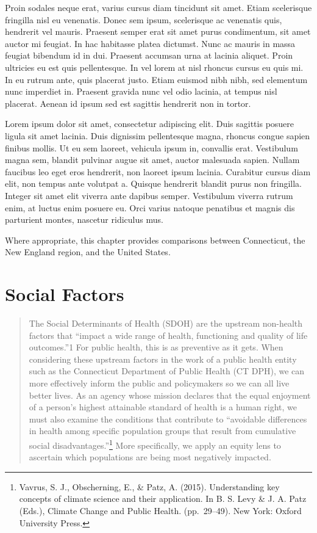 \documentclass[
  letterpaper,
  DIV=11,
  numbers=noendperiod]{scrreprt}
\begin{document}
Proin sodales neque erat, varius cursus diam tincidunt sit amet. Etiam
scelerisque fringilla nisl eu venenatis. Donec sem ipsum, scelerisque ac
venenatis quis, hendrerit vel mauris. Praesent semper erat sit amet
purus condimentum, sit amet auctor mi feugiat. In hac habitasse platea
dictumst. Nunc ac mauris in massa feugiat bibendum id in dui. Praesent
accumsan urna at lacinia aliquet. Proin ultricies eu est quis
pellentesque. In vel lorem at nisl rhoncus cursus eu quis mi. In eu
rutrum ante, quis placerat justo. Etiam euismod nibh nibh, sed elementum
nunc imperdiet in. Praesent gravida nunc vel odio lacinia, at tempus
nisl placerat. Aenean id ipsum sed est sagittis hendrerit non in tortor.

Lorem ipsum dolor sit amet, consectetur adipiscing elit. Duis sagittis
posuere ligula sit amet lacinia. Duis dignissim pellentesque magna,
rhoncus congue sapien finibus mollis. Ut eu sem laoreet, vehicula ipsum
in, convallis erat. Vestibulum magna sem, blandit pulvinar augue sit
amet, auctor malesuada sapien. Nullam faucibus leo eget eros hendrerit,
non laoreet ipsum lacinia. Curabitur cursus diam elit, non tempus ante
volutpat a. Quisque hendrerit blandit purus non fringilla. Integer sit
amet elit viverra ante dapibus semper. Vestibulum viverra rutrum enim,
at luctus enim posuere eu. Orci varius natoque penatibus et magnis dis
parturient montes, nascetur ridiculus mus.

Where appropriate, this chapter provides comparisons between
Connecticut, the New England region, and the United States.

\chapter{Social Factors}\label{social-factors}

\begin{quote}
The Social Determinants of Health (SDOH) are the upstream non-health
factors that ``impact a wide range of health, functioning and quality of
life outcomes.''1 For public health, this is as preventive as it gets.
When considering these upstream factors in the work of a public health
entity such as the Connecticut Department of Public Health (CT DPH), we
can more effectively inform the public and policymakers so we can all
live better lives. As an agency whose mission declares that the equal
enjoyment of a person's highest attainable standard of health is a human
right, we must also examine the conditions that contribute to
``avoidable differences in health among specific population groups that
result from cumulative social disadvantages.''\footnote{Vavrus, S. J.,
  Obscherning, E., \& Patz, A. (2015). Understanding key concepts of
  climate science and their application. In B. S. Levy \& J. A. Patz
  (Eds.), Climate Change and Public Health. (pp.~29--49). New York:
  Oxford University Press.} More specifically, we apply an equity lens
to ascertain which populations are being most negatively impacted.
\end{quote}
\end{document}
